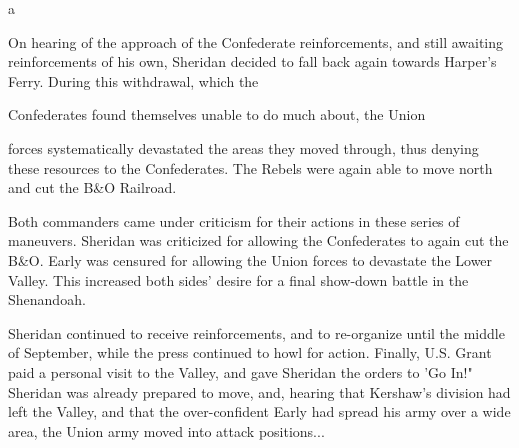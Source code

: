 a

On hearing of the approach of the Confederate reinforcements, and still awaiting reinforcements of his own, Sheridan decided to fall back again towards Harper's Ferry. During this withdrawal, which the

\begin{scenariodata}
Confederates found themselves unable to do much about, the Union\\
\end{scenariodata}

forces systematically devastated the areas they moved through, thus denying these resources to the Confederates. The Rebels were again able to move north and cut the B\&O Railroad.

Both commanders came under criticism for their actions in these series of maneuvers. Sheridan was criticized for allowing the Confederates to again cut the B\&O. Early was censured for allowing the Union forces to devastate the Lower Valley. This increased both sides' desire for a final show-down battle in the Shenandoah.

Sheridan continued to receive reinforcements, and to re-organize until the middle of September, while the press continued to howl for action. Finally, U.S. Grant paid a personal visit to the Valley, and gave Sheridan the orders to 'Go In!" Sheridan was already prepared to move, and, hearing that Kershaw's division had left the Valley, and that the over-confident Early had spread his army over a wide area, the Union army moved into attack positions...

